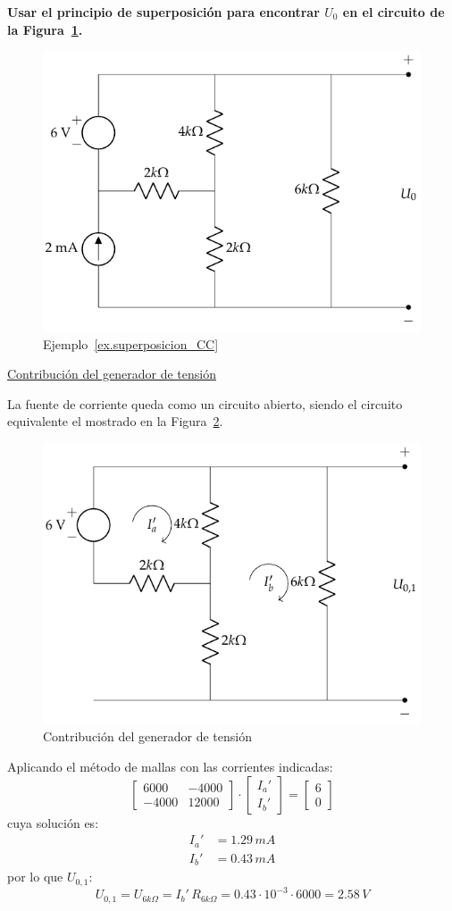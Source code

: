 \begin{example}\label{ex.superposicion_CC}
    \textbf{Usar el principio de superposición para encontrar $U_0$ en el circuito de la Figura~\ref{fig.ej_superposicion_cc}.}
    \begin{figure}[H]
        \centering
        \includegraphics[width=0.4\linewidth]{../figs/ej_superposicion_cc.pdf}
        \caption{Ejemplo~\ref{ex.superposicion_CC}}
        \label{fig.ej_superposicion_cc}
    \end{figure}
    
    \underline{Contribución del generador de tensión}
    
    La fuente de corriente queda como un circuito abierto, siendo el circuito equivalente el mostrado en la Figura~\ref{fig.ej_superposicion_cc_tension}. 
    \begin{figure}[H]
        \centering
        \includegraphics[width=0.4\linewidth]{../figs/ej_superposicion_cc_tension.pdf}
        \caption{Contribución del generador de tensión}
        \label{fig.ej_superposicion_cc_tension}
    \end{figure}
    
    Aplicando el método de mallas con las corrientes indicadas:
    \begin{equation*}
        \begin{bmatrix}
            6000 & -4000\\
            -4000 & 12000
        \end{bmatrix}
        \cdot
        \begin{bmatrix}
            I_a'\\
            I_b'
        \end{bmatrix}
        =
        \begin{bmatrix}
            6\\
            0
        \end{bmatrix}
    \end{equation*}
    cuya solución es:
    \begin{align*}
        I_a'&=1.29\,mA\\
        I_b'&=0.43\,mA
    \end{align*}
    por lo que $U_{0,1}$:
    \begin{equation*}
        U_{0,1}=U_{6k\Omega}=I_b'\, R_{6k\Omega}=0.43\cdot 10^{-3}\cdot 6000= 2.58\,V
    \end{equation*}
    

\end{example}
